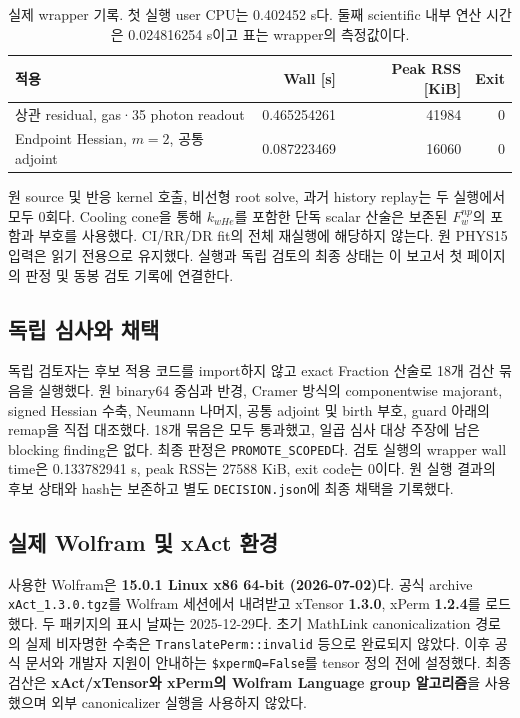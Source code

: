\begin{table}[H]
\centering\small
\begin{tabularx}{\textwidth}{@{}Xrrr@{}}
\toprule
적용 & Wall [s] & Peak RSS [KiB] & Exit\\\midrule
상관 residual, gas·35 photon readout & 0.465254261 & 41984 & 0\\
Endpoint Hessian, $m=2$, 공통 adjoint & 0.087223469 & 16060 & 0\\
\bottomrule
\end{tabularx}
\caption{실제 wrapper 기록. 첫 실행 user CPU는 0.402452 s다. 둘째 scientific 내부 연산 시간은 0.024816254 s이고 표는 wrapper의 측정값이다.}
\label{tab:runs}
\end{table}

원 source 및 반응 kernel 호출, 비선형 root solve, 과거 history replay는 두 실행에서 모두 0회다. Cooling cone을 통해 $k_{wHe}$를 포함한 단독 scalar 산술은 보존된 $F_w^{np}$의 포함과 부호를 사용했다. CI/RR/DR fit의 전체 재실행에 해당하지 않는다. 원 PHYS15 입력은 읽기 전용으로 유지했다. 실행과 독립 검토의 최종 상태는 이 보고서 첫 페이지의 판정 및 동봉 검토 기록에 연결한다.\cite{app16,endpoint16,sourceaudit}

\subsection{독립 심사와 채택}
독립 검토자는 후보 적용 코드를 import하지 않고 exact Fraction 산술로 18개 검산 묶음을 실행했다. 원 binary64 중심과 반경, Cramer 방식의 componentwise majorant, signed Hessian 수축, Neumann 나머지, 공통 adjoint 및 birth 부호, guard 아래의 remap을 직접 대조했다. 18개 묶음은 모두 통과했고, 일곱 심사 대상 주장에 남은 blocking finding은 없다. 최종 판정은 \texttt{PROMOTE\_SCOPED}다. 검토 실행의 wrapper wall time은 0.133782941 s, peak RSS는 27588 KiB, exit code는 0이다. 원 실행 결과의 후보 상태와 hash는 보존하고 별도 \texttt{DECISION.json}에 최종 채택을 기록했다.\cite{review16}

\subsection{실제 Wolfram 및 xAct 환경}
사용한 Wolfram은 \textbf{15.0.1 Linux x86 64-bit (2026-07-02)}다. 공식 archive \texttt{xAct\_1.3.0.tgz}를 Wolfram 세션에서 내려받고 xTensor \textbf{1.3.0}, xPerm \textbf{1.2.4}를 로드했다. 두 패키지의 표시 날짜는 2025-12-29다. 초기 MathLink canonicalization 경로의 실제 비자명한 수축은 \texttt{TranslatePerm::invalid} 등으로 완료되지 않았다. 이후 공식 문서와 개발자 지원이 안내하는 \texttt{\$xpermQ=False}를 tensor 정의 전에 설정했다. 최종 검산은 \textbf{xAct/xTensor와 xPerm의 Wolfram Language group 알고리즘}을 사용했으며 외부 canonicalizer 실행을 사용하지 않았다.\cite{xact,xactrun}

